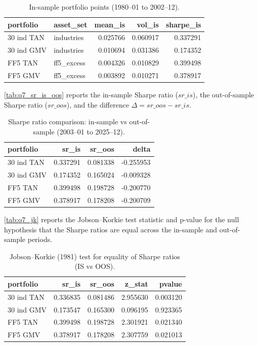 \documentclass[11pt]{exam}
\begin{document}
\begin{table}[H]
\centering
\caption{In-sample portfolio points (1980--01 to 2002--12).}
\label{tab:q7_is_points}
\begin{tabular}{l l r r r}
\toprule
portfolio & asset\_set & mean\_is & vol\_is & sharpe\_is \\
\midrule
30 ind TAN & industries & 0.025766 & 0.060917 & 0.337291 \\
30 ind GMV & industries & 0.010694 & 0.031386 & 0.174352 \\
FF5 TAN & ff5\_excess & 0.004326 & 0.010829 & 0.399498 \\
FF5 GMV & ff5\_excess & 0.003892 & 0.010271 & 0.378917 \\
\bottomrule
\end{tabular}
\end{table}

\autoref{tab:q7_sr_is_oos} reports the in-sample Sharpe ratio ($sr\_is$), the out-of-sample Sharpe ratio ($sr\_oos$), and the difference $\Delta = sr\_oos - sr\_is$.

\begin{table}[H]
\centering
\caption{Sharpe ratio comparison: in-sample vs out-of-sample (2003--01 to 2025--12).}
\label{tab:q7_sr_is_oos}
\begin{tabular}{l r r r}
\toprule
portfolio & sr\_is & sr\_oos & delta \\
\midrule
30 ind TAN & 0.337291 & 0.081338 & -0.255953 \\
30 ind GMV & 0.174352 & 0.165024 & -0.009328 \\
FF5 TAN & 0.399498 & 0.198728 & -0.200770 \\
FF5 GMV & 0.378917 & 0.178208 & -0.200709 \\
\bottomrule
\end{tabular}
\end{table}

\autoref{tab:q7_jk} reports the Jobson--Korkie test statistic and p-value for the null hypothesis that the Sharpe ratios are equal across the in-sample and out-of-sample periods.

\begin{table}[H]
\centering
\caption{Jobson--Korkie (1981) test for equality of Sharpe ratios (IS vs OOS).}
\label{tab:q7_jk}
\begin{tabular}{l r r r r}
\toprule
portfolio & sr\_is & sr\_oos & z\_stat & pvalue \\
\midrule
30 ind TAN & 0.336835 & 0.081486 & 2.955630 & 0.003120 \\
30 ind GMV & 0.173547 & 0.165300 & 0.096195 & 0.923365 \\
FF5 TAN & 0.399498 & 0.198728 & 2.301921 & 0.021340 \\
FF5 GMV & 0.378917 & 0.178208 & 2.307759 & 0.021013 \\
\bottomrule
\end{tabular}
\end{table}
\end{document}
